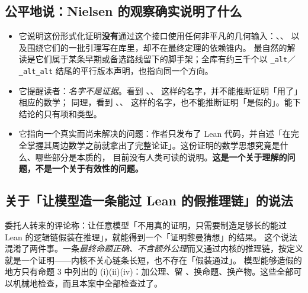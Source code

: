 \subsection{公平地说：Nielsen 的观察确实说明了什么}

\begin{itemize}
\item 它说明这份形式化证明\textbf{没有}通过这个接口使用任何非平凡的几何输入：、、 以及围绕它们的一批引理写在库里，却不在最终定理的依赖锥内。
最自然的解读是它们属于某条早期或备选路线留下的脚手架；全库有约三千个以 \texttt{\_alt}／\texttt{\_alt\_alt} 结尾的平行版本声明，也指向同一个方向。
\item 它提醒读者：\emph{名字不是证据}。看到 、、 这样的名字，并不能推断证明「用了」相应的数学；
同理，看到 、、 这样的名字，也不能推断证明「是假的」。能下结论的只有项和类型。
\item 它指向一个真实而尚未解决的问题：作者只发布了 Lean 代码，并自述「在完全掌握其周边数学之前就拿出了完整论证」。这份证明的数学思想究竟是什么、哪些部分是本质的，
目前没有人类可读的说明。\textbf{这是一个关于理解的问题，不是一个关于有效性的问题。}
\end{itemize}

\subsection{关于「让模型造一条能过 Lean 的假推理链」的说法}

委托人转来的评论称：让任意模型「不用真的证明，只需要制造足够长的能过 Lean 的逻辑链假装在推理」，就能得到一个「证明黎曼猜想」的结果。
这个说法混淆了两件事。一条\emph{最终命题正确、不含额外公理}而又通过内核的推理链，按定义就是一个证明——内核不关心链条长短，也不存在「假装通过」。
模型能够造假的地方只有命题 3 中列出的 (i)(ii)(iv)：加公理、留 、换命题、换产物。这些全部可以机械地检查，而且本案中全部检查过了。
